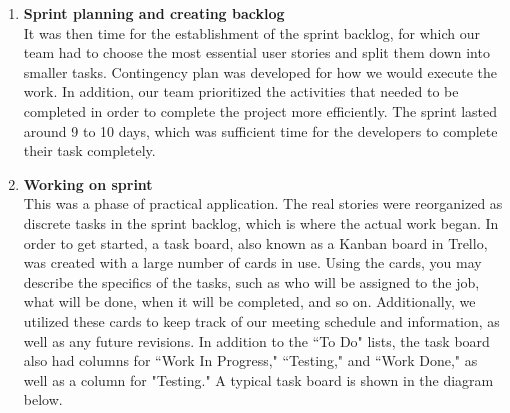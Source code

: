 \begin{enumerate}

\item \textbf{Sprint planning and creating backlog}\\

It was then time for the establishment of the sprint backlog, for which our team had to choose the most essential user stories and split them down into smaller tasks. Contingency plan was developed for how we would execute the work. In addition, our team prioritized the activities that needed to be completed in order to complete the project more efficiently. The sprint lasted around 9 to 10 days, which was sufficient time for the developers to complete their task completely.

\item \textbf{Working on sprint}\\

This was a phase of practical application. The real stories were reorganized as discrete tasks in the sprint backlog, which is where the actual work began. In order to get started, a task board, also known as a Kanban board in Trello\footnotemark , was created with a large number of cards in use. Using the cards, you may describe the specifics of the tasks, such as who will be assigned to the job, what will be done, when it will be completed, and so on. Additionally, we utilized these cards to keep track of our meeting schedule and information, as well as any future revisions. In addition to the ``To Do" lists, the task board also had columns for ``Work In Progress," ``Testing," and ``Work Done," as well as a column for "Testing." A typical task board is shown in the diagram below.
\\


\end{enumerate}
